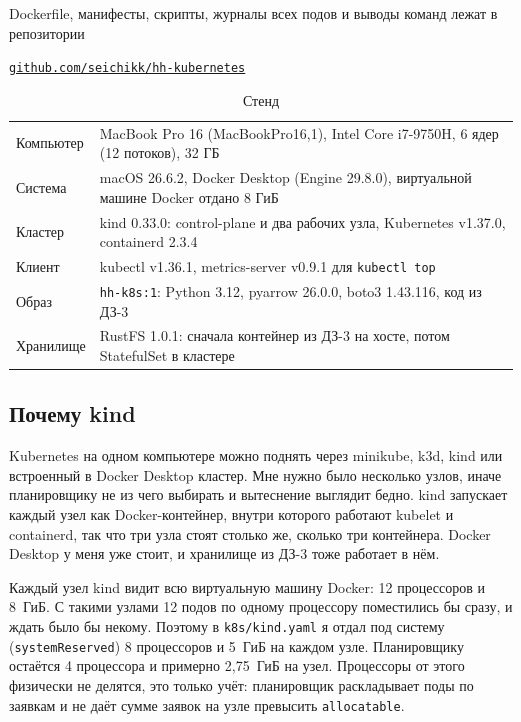\documentclass[11pt,a4paper]{article}
\newcommand{\repoUrl}{\texttt{github.com/seichikk/hh-kubernetes}}
\begin{document}
Dockerfile, манифесты, скрипты, журналы всех подов и выводы команд лежат в репозитории
\begin{center}\href{https://github.com/seichikk/hh-kubernetes}{\repoUrl}\end{center}

\begin{table}[H]
\centering
\small
\begin{tabular}{@{}ll@{}}
\toprule
Компьютер & MacBook Pro 16 (MacBookPro16,1), Intel Core i7-9750H, 6 ядер (12 потоков), 32 ГБ \\
Система & macOS 26.6.2, Docker Desktop (Engine 29.8.0), виртуальной машине Docker отдано 8 ГиБ \\
Кластер & kind 0.33.0: control-plane и два рабочих узла, Kubernetes v1.37.0, containerd 2.3.4 \\
Клиент & kubectl v1.36.1, metrics-server v0.9.1 для \texttt{kubectl top} \\
Образ & \texttt{hh-k8s:1}: Python 3.12, pyarrow 26.0.0, boto3 1.43.116, код из ДЗ-3 \\
Хранилище & RustFS 1.0.1: сначала контейнер из ДЗ-3 на хосте, потом StatefulSet в кластере \\
\bottomrule
\end{tabular}
\caption{Стенд}
\end{table}

\subsection{Почему kind}

Kubernetes на одном компьютере можно поднять через minikube, k3d, kind или встроенный в Docker Desktop кластер. Мне нужно было несколько узлов, иначе планировщику не из чего выбирать и вытеснение выглядит бедно. kind запускает каждый узел как Docker-контейнер, внутри которого работают kubelet и containerd, так что три узла стоят столько же, сколько три контейнера. Docker Desktop у меня уже стоит, и хранилище из ДЗ-3 тоже работает в нём.

Каждый узел kind видит всю виртуальную машину Docker: 12 процессоров и 8~ГиБ. С такими узлами 12 подов по одному процессору поместились бы сразу, и ждать было бы некому. Поэтому в \texttt{k8s/kind.yaml} я отдал под систему (\texttt{systemReserved}) 8 процессоров и 5~ГиБ на каждом узле. Планировщику остаётся 4 процессора и примерно 2,75~ГиБ на узел. Процессоры от этого физически не делятся, это только учёт: планировщик раскладывает поды по заявкам и не даёт сумме заявок на узле превысить \texttt{allocatable}.
\end{document}
